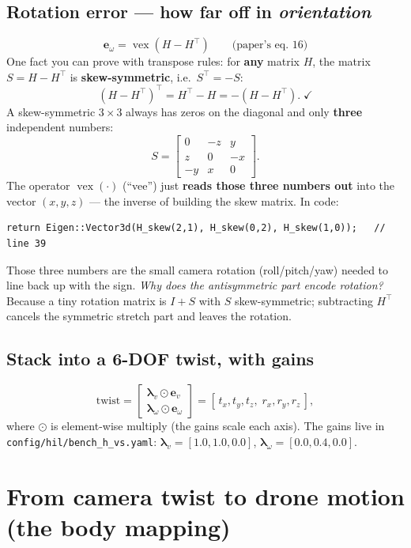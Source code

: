 \documentclass[11pt]{article}
\DeclareMathOperator{\vex}{vex}
\begin{document}
\subsection{Rotation error --- how far off in \emph{orientation}}
\[
\mathbf{e}_\omega=\vex\!\left(H-H^{\top}\right)\qquad\text{(paper's eq.\ 16)}
\]
One fact you can prove with transpose rules: for \textbf{any} matrix $H$, the
matrix $S=H-H^{\top}$ is \textbf{skew-symmetric}, i.e.\ $S^{\top}=-S$:
\[
(H-H^{\top})^{\top}=H^{\top}-H=-(H-H^{\top}).\;\checkmark
\]
A skew-symmetric $3\times3$ always has zeros on the diagonal and only
\textbf{three} independent numbers:
\[
S=\begin{bmatrix} 0&-z&y\\ z&0&-x\\ -y&x&0\end{bmatrix}.
\]
The operator $\vex(\cdot)$ (``vee'') just \textbf{reads those three numbers out}
into the vector $(x,y,z)$ --- the inverse of building the skew matrix. In code:
\begin{lstlisting}
return Eigen::Vector3d(H_skew(2,1), H_skew(0,2), H_skew(1,0));   // line 39
\end{lstlisting}
Those three numbers are the small camera rotation (roll/pitch/yaw) needed to
line back up with the sign. \emph{Why does the antisymmetric part encode
rotation?} Because a tiny rotation matrix is $I+S$ with $S$ skew-symmetric;
subtracting $H^{\top}$ cancels the symmetric stretch part and leaves the
rotation.

\subsection{Stack into a 6-DOF twist, with gains}
\[
\text{twist}=\begin{bmatrix}\boldsymbol{\lambda}_v\odot\mathbf{e}_v\\
\boldsymbol{\lambda}_\omega\odot\mathbf{e}_\omega\end{bmatrix}
=[\,t_x,t_y,t_z,\;r_x,r_y,r_z\,],
\]
where $\odot$ is element-wise multiply (the gains scale each axis). The gains
live in \texttt{config/hil/bench\_h\_vs.yaml}:
$\boldsymbol{\lambda}_v=[1.0,1.0,0.0]$,
$\boldsymbol{\lambda}_\omega=[0.0,0.4,0.0]$.

\section{From camera twist to drone motion (the body mapping)}
\end{document}

